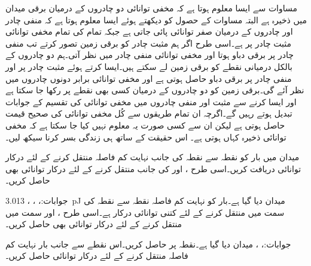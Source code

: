 مساوات  سے ایسا معلوم ہوتا ہے کہ مخفی توانائی دو چادروں کے درمیان برقی میدان میں ذخیرہ ہے البتہ مساوات  کے حصول کو دیکھتے ہوئے  ایسا معلوم ہوتا ہے کہ منفی چادر اور چادروں کے درمیان صفر توانائی پائی جاتی ہے جبکہ تمام کی تمام مخفی توانائی مثبت چادر پر ہے۔اسی طرح اگر ہم مثبت چادر کو برقی زمین تصور کرتے تب منفی چادر پر برقی دباو  ہوتا اور مخفی توانائی منفی چادر میں نظر آتی۔ہم دو چادروں کے بالکل درمیانی نقطے کو برقی زمین لے سکتے ہیں۔ایسا کرتے ہوئے مثبت چادر پر  اور منفی چادر پر  برقی دباو حاصل ہوتی ہے اور مخفی توانائی برابر دونوں چادروں میں نظر آئے گی۔برقی زمین کو دو چادروں کے درمیان کسی بھی نقطے پر رکھا جا سکتا ہے اور ایسا کرنے سے مثبت اور منفی چادروں میں مخفی توانائی کی تقسیم کے  جوابات تبدیل ہوتے رہیں گے۔اگرچہ ان تمام طریقوں سے کُل مخفی توانائی کی صحیح قیمت حاصل ہوتی ہے لیکن ان سے کسی صورت یہ معلوم نہیں کیا جا سکتا ہے کہ مخفی توانائی ذخیرہ کہاں ہوتی ہے۔ اس حقیقت کے ساتھ ہی زندگی بسر کرنا سیکھ لیں۔ 


\newpage
{}

میدان  میں  بار کو نقطہ  سے
 نقطہ  کی جانب نہایت کم فاصلہ  منتقل کرنے کے لئے درکار توانائی دریافت کریں۔اسی طرح ،  اور  کی جانب منتقل کرنے کے لئے درکار توانائی بھی حاصل کریں۔

جوابات:، ، ، {\SI{3.013}{\pico\joule}}
میدان  دیا گیا ہے۔بار  کو نہایت کم فاصلہ  نقطہ  سے نقطہ  کی سمت میں منتقل کرنے کے لئے کتنی توانائی درکار ہے۔اسی طرح ،  اور  سمت میں منتقل کرنے کے لئے درکار توانائی بھی حاصل کریں۔

جوابات:، ، 
میدان  دیا گیا ہے۔نقطہ  پر  حاصل کریں۔اس نقطے سے  جانب  بار نہایت کم فاصلہ  منتقل کرنے کے لئے درکار توانائی حاصل کریں۔
 

